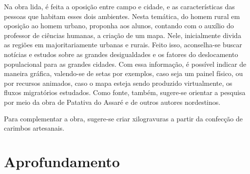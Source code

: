 \documentclass[12pt]{extarticle}
\begin{document}

Na obra lida, é feita a oposição entre campo e cidade, e as
características das pessoas que habitam esses dois ambientes. Nesta
temática, do homem rural em oposição ao homem urbano, proponha aos
alunos, contando com o auxílio do professor de ciências humanas, a
criação de um mapa. Nele, inicialmente divida as regiões em
majoritariamente urbanas e rurais. Feito isso, aconselha-se buscar
notícias e estudos sobre as grandes desigualdades e os fatores do
deslocamento populacional para as grandes cidades. Com essa informação,
é possível indicar de maneira gráfica, valendo-se de setas por exemplos,
caso seja um painel físico, ou por recursos animados, caso o mapa esteja
sendo produzido virtualmente, os fluxos migratórios estudados. Como
fonte, também, sugere-se orientar a pesquisa por meio da obra de
Patativa do Assaré e de outros autores nordestinos.

Para complementar a obra, sugere-se criar xilogravuras a partir da
confecção de carimbos artesanais.


\section{Aprofundamento}
\end{document}
